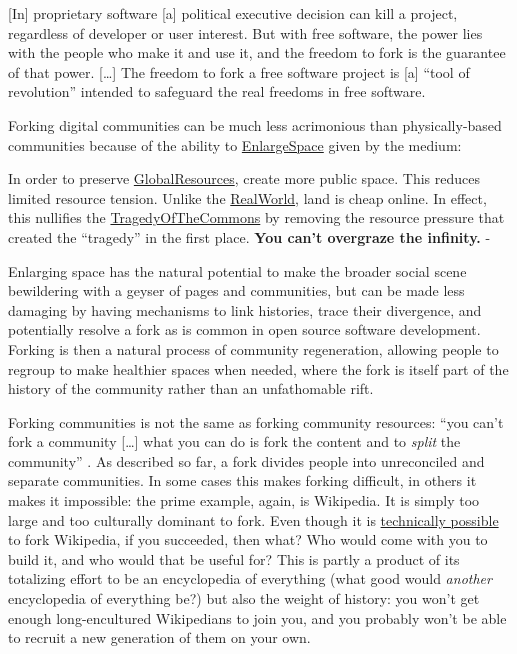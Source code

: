 \begin{leftbar}
{[}In{]} proprietary software {[}a{]} political executive decision can
kill a project, regardless of developer or user interest. But with free
software, the power lies with the people who make it and use it, and the
freedom to fork is the guarantee of that power. {[}\ldots{]} The freedom
to fork a free software project is {[}a{]} ``tool of revolution''
intended to safeguard the real freedoms in free software. \citep{hancockOpenOfficeOrgDead2010} 
\end{leftbar}

Forking digital communities can be much less acrimonious than
physically-based communities because of the ability to
\href{http://meatballwiki.org/wiki/EnlargeSpace}{EnlargeSpace} given by
the medium:

\begin{leftbar}
In order to preserve
\href{http://meatballwiki.org/wiki/GlobalResource}{GlobalResources},
create more public space. This reduces limited resource tension. Unlike
the \href{http://meatballwiki.org/wiki/RealWorld}{RealWorld}, land is
cheap online. In effect, this nullifies the
\href{http://meatballwiki.org/wiki/GlobalResource}{TragedyOfTheCommons}
by removing the resource pressure that created the ``tragedy'' in the
first place. \textbf{You can't overgraze the infinity.} - \citep{MeatballWikiEnlargeSpace} 
\end{leftbar}

Enlarging space has the natural potential to make the broader social
scene bewildering with a geyser of pages and communities, but can be
made less damaging by having mechanisms to link histories, trace their
divergence, and potentially resolve a fork as is common in open source
software development. Forking is then a natural process of community
regeneration, allowing people to regroup to make healthier spaces when
needed, where the fork is itself part of the history of the community
rather than an unfathomable rift.

Forking communities is not the same as forking community resources:
``you can't fork a community {[}\ldots{]} what you can do is fork the
content and to \emph{split} the community'' \citep{MeatballWikiForkingOfOnlineCommunitiesa} . As described so far, a
fork divides people into unreconciled and separate communities. In some
cases this makes forking difficult, in others it makes it impossible:
the prime example, again, is Wikipedia. It is simply too large and too
culturally dominant to fork. Even though it is
\href{https://en.wikipedia.org/wiki/Wikipedia:FAQ/Forking\#Am_I_allowed_to_fork_Wikipedia?}{technically
possible} to fork Wikipedia, if you succeeded, then what? Who would come
with you to build it, and who would that be useful for? This is partly a
product of its totalizing effort to be an encyclopedia of everything
(what good would \emph{another} encyclopedia of everything be?) but also
the weight of history: you won't get enough long-encultured Wikipedians
to join you, and you probably won't be able to recruit a new generation
of them on your own.

